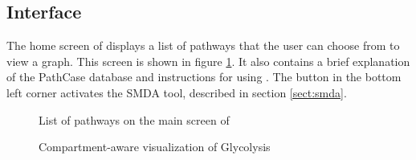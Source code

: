 \subsection{Interface}
\label{sect:maw_interface}

The home screen of \mawapp displays a list of pathways that the user can choose
from to view a graph. This screen is shown in figure
\ref{fig:maw_screenshot_list}. It also contains a brief explanation of the
PathCase database and instructions for using \mawapp. The button in the bottom
left corner activates the SMDA tool, described in section \ref{sect:smda}.

\begin{figure}[htbp]
    \caption{\label{fig:maw_screenshot_list} List of pathways on the main screen
    of \mawapp}
\end{figure}

\begin{figure}[hbtp]
    \caption{\label{fig:maw_screenshot_pathway} Compartment-aware visualization
    of Glycolysis}
\end{figure}

